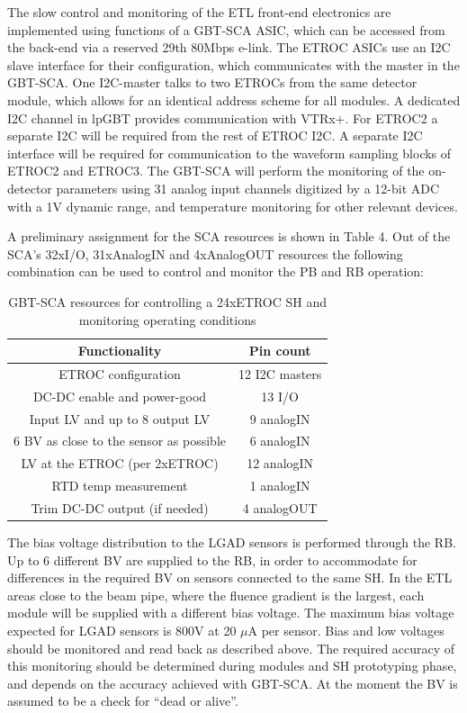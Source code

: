 \documentclass[11pt]{article}
\begin{document}
The slow control and monitoring of the ETL front-end electronics are implemented using functions of a GBT-SCA ASIC, which can be accessed from the back-end via a reserved 29th 80Mbps e-link. The ETROC ASICs use an I2C slave interface for their configuration, which communicates with the master in the GBT-SCA. One I2C-master talks to two ETROCs from the same detector module, which allows for an identical address scheme for all modules. A dedicated I2C channel in lpGBT provides communication with VTRx+. For ETROC2 a separate I2C will be required from the rest of ETROC I2C. A separate I2C interface will be required for communication to the waveform sampling blocks of ETROC2 and ETROC3. The GBT-SCA will perform the monitoring of the on-detector parameters using 31 analog input channels digitized by a 12-bit ADC with a 1V dynamic range, and temperature monitoring for other relevant devices.

A preliminary assignment for the SCA resources is shown in Table 4. Out of the SCA's 32xI/O, 31xAnalogIN and 4xAnalogOUT resources the following combination can be used to control and monitor the PB and RB operation:

\begin{table}
  \centering
  \begin{tabular}{ c c }
    \textbf{Functionality}                  & \textbf{Pin count} \\
    \midrule
    ETROC configuration                     & 12 I2C masters     \\
    DC-DC enable and power-good             & 13 I/O             \\
    Input LV and up to 8 output LV          & 9 analogIN         \\
    6 BV as close to the sensor as possible & 6 analogIN         \\
    LV at the ETROC (per 2xETROC)           & 12 analogIN        \\
    RTD temp measurement                    & 1 analogIN         \\
    Trim DC-DC output (if needed)           & 4 analogOUT        \\
  \end{tabular}
  \caption{GBT-SCA resources for controlling a 24xETROC SH and monitoring operating conditions}
\end{table}

The bias voltage distribution to the LGAD sensors is performed through the RB. Up to 6 different BV are supplied to the RB, in order to accommodate for differences in the required BV on sensors connected to the same SH. In the ETL areas close to the beam pipe, where the fluence gradient is the largest, each module will be supplied with a different bias voltage. The maximum bias voltage expected for LGAD sensors is 800V at 20 $\mu$A per sensor. Bias and low voltages should be monitored and read back as described above. The required accuracy of this monitoring should be determined during modules and SH prototyping phase, and depends on the accuracy achieved with GBT-SCA. At the moment the BV is assumed to be a check for ``dead or alive''.
\end{document}
